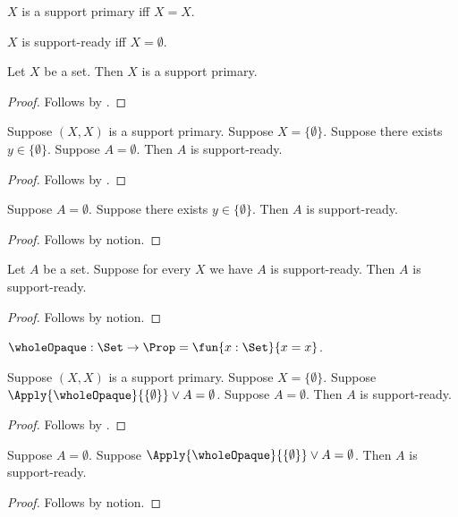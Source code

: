 \begin{definition}\label{whole_support_primary}
    $X$ is a support primary iff $X=X$.
\end{definition}

\begin{definition}\label{whole_support_target}
    $X$ is support-ready iff $X=\emptyset$.
\end{definition}

\begin{classification}\label{whole_support_all_primary}
    Let $X$ be a set.
    Then $X$ is a support primary.
\end{classification}
\begin{proof}
    Follows by .
\end{proof}

\begin{classification}\label{whole_support_consumer_rule}
    Suppose $(X,X)$ is a support primary.
    Suppose $X=\{\emptyset\}$.
    Suppose there exists $y\in\{\emptyset\}$.
    Suppose $A=\emptyset$.
    Then $A$ is support-ready.
\end{classification}
\begin{proof}
    Follows by .
\end{proof}

\begin{proposition}\label{whole_support_source_consumer}
    Suppose $A=\emptyset$.
    Suppose there exists $y\in\{\emptyset\}$.
    Then $A$ is support-ready.
\end{proposition}
\begin{proof}
    Follows by notion.
\end{proof}

\begin{proposition}\label{whole_support_unused_binder}
    Let $A$ be a set.
    Suppose for every $X$ we have $A$ is support-ready.
    Then $A$ is support-ready.
\end{proposition}
\begin{proof}
    Follows by notion.
\end{proof}


\begin{definition}\label{whole_support_opaque}
    $\wholeOpaque : \Set\to\Prop = \fun{x:\Set}{x=x}$.
\end{definition}

\begin{classification}\label{whole_support_mixed_rule}
    Suppose $(X,X)$ is a support primary.
    Suppose $X=\{\emptyset\}$.
    Suppose $\Apply{\wholeOpaque}{\{\emptyset\}}\lor A=\emptyset$.
    Suppose $A=\emptyset$.
    Then $A$ is support-ready.
\end{classification}
\begin{proof}
    Follows by .
\end{proof}

\begin{proposition}\label{whole_support_mixed_consumer}
    Suppose $A=\emptyset$.
    Suppose $\Apply{\wholeOpaque}{\{\emptyset\}}\lor A=\emptyset$.
    Then $A$ is support-ready.
\end{proposition}
\begin{proof}
    Follows by notion.
\end{proof}
